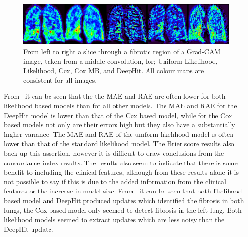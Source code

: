 \begin{table}
    \end{table}

    \begin{figure}
        
        \centering

        \includegraphics[width=1.0\linewidth]{Figures/grad_cam.jpg}
        
        \vspace{-0.25cm}
        
        \captionsetup{singlelinecheck=false, justification=centering}
        \caption{
            From left to right a slice through a fibrotic region of a Grad-CAM image, taken from a middle convolution, for; Uniform Likelihood, Likelihood, Cox, Cox \gls{MB}, and DeepHit. All colour maps are consistent for all images.
        }
        \label{fig:grad_cam}
        
       \vspace{-0.5cm}
   \end{figure}

    From~ it can be seen that the the \gls{MAE} and \gls{RAE} are often lower for both likelihood based models than for all other models. The \gls{MAE} and \gls{RAE} for the DeepHit model is lower than that of the Cox based model, while for the Cox based models not only are their errors high but they also have a substantially higher variance. The \gls{MAE} and \gls{RAE} of the uniform likelihood model is often lower than that of the standard likelihood model. The Brier score results also back up this assertion, however it is difficult to draw conclusions from the concordance index results. The results also seem to indicate that there is some benefit to including the clinical features, although from these results alone it is not possible to say if this is due to the added information from the clinical features or the increase in model size. From~ it can be seen that both likelihood based model and DeepHit produced updates which identified the fibrosis in both lungs, the Cox based model only seemed to detect fibrosis in the left lung. Both likelihood models seemed to extract updates which are less noisy than the DeepHit update.

